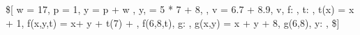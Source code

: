 \$[
w = 17,
p = 1,
y = \if p  + w ,
y,
\sigma = 5 * 7 + 8,
\sigma,
v = 6.7 + 8.9,
v,
f: \Z \rightarrow \Z,
t: \Z \rightarrow \Z,
t(x) = x + 1,
f(x,y,t)  = x+ y + t(7) + \sigma,
f(6,8,t),
g: \Z \rightarrow \Z,
g(x,y) = x + y + 8,
g(6,8),
y: \R \rightarrow \R,
\$]

